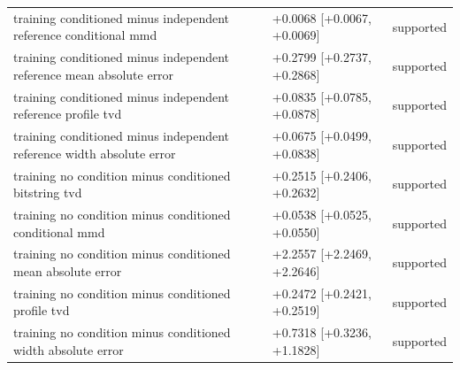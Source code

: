 \begin{table}[p]
\begin{tabular}{@{}p{}p{}p{}@{}}
training conditioned minus independent reference conditional mmd & +0.0068 [+0.0067, +0.0069] & supported \\
training conditioned minus independent reference mean absolute error & +0.2799 [+0.2737, +0.2868] & supported \\
training conditioned minus independent reference profile tvd & +0.0835 [+0.0785, +0.0878] & supported \\
training conditioned minus independent reference width absolute error & +0.0675 [+0.0499, +0.0838] & supported \\
training no condition minus conditioned bitstring tvd & +0.2515 [+0.2406, +0.2632] & supported \\
training no condition minus conditioned conditional mmd & +0.0538 [+0.0525, +0.0550] & supported \\
training no condition minus conditioned mean absolute error & +2.2557 [+2.2469, +2.2646] & supported \\
training no condition minus conditioned profile tvd & +0.2472 [+0.2421, +0.2519] & supported \\
training no condition minus conditioned width absolute error & +0.7318 [+0.3236, +1.1828] & supported \\
\bottomrule
\end{tabular}
\end{table}
\clearpage
